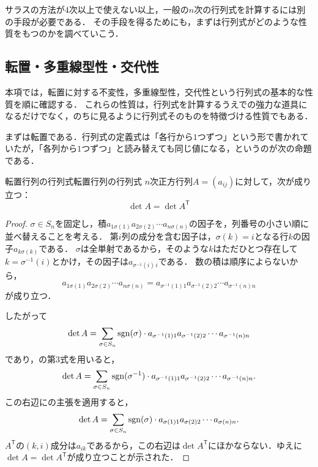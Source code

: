 サラスの方法が$4$次以上で使えない以上，一般の$n$次の行列式を計算するには別の手段が必要である．
その手段を得るためにも，まずは行列式がどのような性質をもつのかを調べていこう．

\subsection{転置・多重線型性・交代性}

本項では，転置に対する不変性，多重線型性，交代性という行列式の基本的な性質を順に確認する．
これらの性質は，行列式を計算するうえでの強力な道具になるだけでなく，のちに見るように行列式そのものを特徴づける性質でもある．

まずは転置である．行列式の定義式は「各行から$1$つずつ」という形で書かれていたが，「各列から$1$つずつ」と読み替えても同じ値になる，というのが次の命題である．


\begin{prop}{転置行列の行列式}{転置行列の行列式}
  $n$次正方行列$A = (a_{ij})$に対して，次が成り立つ：
  \[
  \det A = \det A^\mathsf{T} 
  \]
\end{prop}

\begin{tleftbar}
\begin{proof}
 $\sigma \in S_n$を固定し，積$a_{1\sigma(1)} a_{2\sigma(2)} \dotsm a_{n\sigma(n)}$の因子を，列番号の小さい順に並べ替えることを考える．
 第$i$列の成分を含む因子は，$\sigma(k) = i$となる行$k$の因子$a_{k\sigma(k)}$である．
 $\sigma$は全単射であるから，そのような$k$はただひとつ存在して$k = \sigma^{-1}(i)$とかけ，その因子は$a_{\sigma^{-1}(i)\,i}$である．
 数の積は順序によらないから，
 \[
 a_{1\sigma(1)} a_{2\sigma(2)} \dotsm a_{n\sigma(n)} =  a_{\sigma^{-1}(1)1} a_{\sigma^{-1}(2)2} \dotsm a_{\sigma^{-1}(n)n}
 \]
 が成り立つ．

 したがって
 \[
  \det A = \sum_{\sigma \in S_n} \sgn(\sigma) \cdot a_{\sigma^{-1}(1)1} a_{\sigma^{-1}(2)2} \dotsm a_{\sigma^{-1}(n)n}
\]
であり，の第3式を用いると，
\[
\det A = \sum_{\sigma \in S_n} \sgn(\sigma^{-1}) \cdot a_{\sigma^{-1}(1)1} a_{\sigma^{-1}(2)2} \dotsm a_{\sigma^{-1}(n)n}.
\]
この右辺にの主張を適用すると，
\[
\det A = \sum_{\sigma \in S_n} \sgn (\sigma ) \cdot a_{\sigma(1)1} a_{\sigma(2)2} \dotsm a_{\sigma(n)n}.
\]
$A^\mathsf{T}$の$(k, i)$成分は$a_{ik}$であるから，この右辺は$\det A^\mathsf{T}$にほかならない．ゆえに$\det A = \det A^\mathsf{T}$が成り立つことが示された．
\end{proof}
\end{tleftbar}

